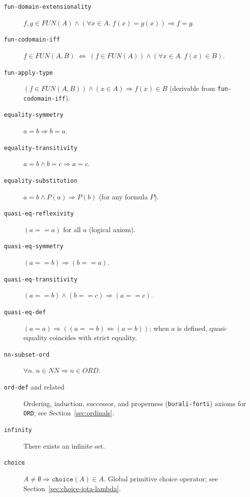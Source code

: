 \documentclass{amsbook}[openany]
\theoremstyle{definition}
\theoremstyle{remark}
\theoremstyle{remark}
\begin{document}
\begin{description}
\item[\texttt{fun-domain-extensionality}]
  $f,g \in \mathit{FUN}(A) \land (\forall x \in A.\;f(x)=g(x))
  \Rightarrow f = g$.

\item[\texttt{fun-codomain-iff}]
  $f \in \mathit{FUN}(A,B) \;\Leftrightarrow\;
  (f \in \mathit{FUN}(A)) \land (\forall x \in A.\;f(x)\in B)$.

\item[\texttt{fun-apply-type}]
  $(f \in \mathit{FUN}(A,B)) \land (x \in A) \Rightarrow f(x) \in B$
  (derivable from \texttt{fun-codomain-iff}).

\item[\texttt{equality-symmetry}]
  $a = b \Rightarrow b = a$.

\item[\texttt{equality-transitivity}]
  $a = b \land b = c \Rightarrow a = c$.

\item[\texttt{equality-substitution}]
  $a = b \land P(a) \Rightarrow P(b)$ (for any formula $P$).

\item[\texttt{quasi-eq-reflexivity}]
  $(a == a)$ for all $a$ (logical axiom).

\item[\texttt{quasi-eq-symmetry}]
  $(a == b) \Rightarrow (b == a)$.

\item[\texttt{quasi-eq-transitivity}]
  $(a == b) \land (b == c) \Rightarrow (a == c)$.

\item[\texttt{quasi-eq-def}]
  $(a = a) \Rightarrow ((a == b) \Leftrightarrow (a = b))$;
  when $a$ is defined, quasi-equality coincides with strict equality.

\item[\texttt{nn-subset-ord}]
  $\forall n.\; n \in \mathit{NN} \Rightarrow n \in \mathit{ORD}$.

\item[\texttt{ord-def} and related]
  Ordering, induction, successor, and properness (\texttt{burali-forti})
  axioms for \texttt{ORD}; see Section~\ref{sec:ordinals}.

\item[\texttt{infinity}]
  There exists an infinite set.

\item[\texttt{choice}]
  $A \neq \emptyset \Rightarrow \texttt{choice}(A) \in A$.
  Global primitive choice operator; see
  Section~\ref{sec:choice-iota-lambda}.


\end{description}
\end{document}

